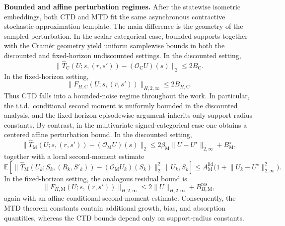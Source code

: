 \documentclass{article}
\begin{document}
\noindent\textbf{Bounded and affine perturbation regimes.}
After the statewise isometric embeddings, both CTD and MTD fit the same asynchronous contractive stochastic-approximation template. The main difference is the geometry of the sampled perturbation. In the scalar categorical case, bounded supports together with the Cram\'er geometry yield uniform samplewise bounds in both the discounted and fixed-horizon undiscounted settings. In the discounted setting,
\begin{equation}
\lVert \widehat T_{\mathrm C}(U;s,(r,s'))-(\mathcal O_{\mathrm C}U)(s) \rVert_2 \le 2B_{\mathrm C}.
\end{equation}
In the fixed-horizon setting,
\begin{equation}
\lVert F_{H,\mathrm C}(U;s,(r,s')) \rVert_{H,2,\infty} \le 2B_{H,\mathrm C}.
\end{equation}
Thus CTD falls into a bounded-noise regime throughout the work. In particular, the i.i.d.\ conditional second moment is uniformly bounded in the discounted analysis, and the fixed-horizon episodewise argument inherits only support-radius constants. By contrast, in the multivariate signed-categorical case one obtains a centered affine perturbation bound. In the discounted setting,
\begin{equation}
\lVert \widehat T_{\mathrm M}(U;s,(r,s'))-(\mathcal O_{\mathrm M}U)(s) \rVert_2 \le 2\beta_{\mathrm M}\lVert U-U^\star \rVert_{2,\infty}+B_{\mathrm M}^\star,
\end{equation}
together with a local second-moment estimate
\begin{equation}
\mathbb E\left[ \lVert \widehat T_{\mathrm M}(U_k;S_k,(R_k,S'_k))-(\mathcal O_{\mathrm M}U_k)(S_k) \rVert_2^2 \,\mid\, U_k,S_k \right] \le A_{\mathrm M}^{\mathrm{iid}}\bigl(1+\lVert U_k-U^\star \rVert_{2,\infty}^2\bigr).
\end{equation}
In the fixed-horizon setting, the analogous residual bound is
\begin{equation}
\lVert F_{H,\mathrm M}(U;s,(r,s')) \rVert_{H,2,\infty} \le 2 \lVert U \rVert_{H,2,\infty}+B^{\mathrm{res}}_{H,\mathrm M},
\end{equation}
again with an affine conditional second-moment estimate. Consequently, the MTD theorem constants contain additional growth, bias, and absorption quantities, whereas the CTD bounds depend only on support-radius constants.
\end{document}

